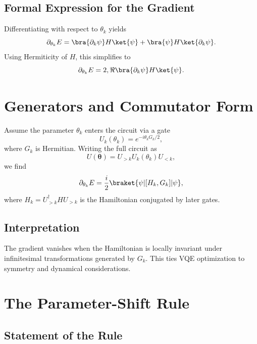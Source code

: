 \documentclass{book}
\begin{document}
\subsection{Formal Expression for the Gradient}

Differentiating with respect to $\theta_k$ yields
\begin{equation}
\partial_{\theta_k} E = \bra{\partial_k \psi} H \ket{\psi} + \bra{\psi} H \ket{\partial_k \psi}.
\end{equation}
Using Hermiticity of $H$, this simplifies to
\begin{equation}
\partial_{\theta_k} E = 2,\Re \bra{\partial_k \psi} H \ket{\psi}.
\end{equation}

\section{Generators and Commutator Form}

Assume the parameter $\theta_k$ enters the circuit via a gate
\begin{equation}
U_k(\theta_k) = e^{-i \theta_k G_k / 2},
\end{equation}
where $G_k$ is Hermitian. Writing the full circuit as
\begin{equation}
U(\bm\theta) = U_{>k} U_k(\theta_k) U_{<k},
\end{equation}
we find
\begin{equation}
\partial_{\theta_k} E = \frac{i}{2} \braket{\psi| [H_k, G_k] |\psi},
\end{equation}
where $H_k = U_{>k}^\dagger H U_{>k}$ is the Hamiltonian conjugated by later gates.

\subsection{Interpretation}

The gradient vanishes when the Hamiltonian is locally invariant under infinitesimal transformations generated by $G_k$. This ties VQE optimization to symmetry and dynamical considerations.

\section{The Parameter-Shift Rule}

\subsection{Statement of the Rule}
\end{document}
